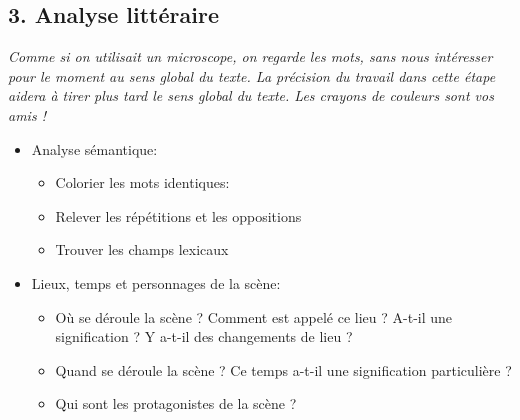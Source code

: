 \subsection*{3. Analyse littéraire}
\textit{Comme si on utilisait un microscope, on regarde les mots, sans nous intéresser pour le moment au sens global du texte. La précision du travail dans cette étape aidera à tirer plus tard le sens global du texte. Les crayons de couleurs sont vos amis !}
\begin{itemize}[label=]
\item Analyse sémantique:
\begin{itemize}[label=]
\item Colorier les mots identiques:
\item Relever les répétitions et les oppositions
\item Trouver les champs lexicaux
\end{itemize}
\item Lieux, temps et personnages de la scène:
\begin{itemize}[label=]
\item Où se déroule la scène ? Comment est appelé ce lieu ? A-t-il une signification ? Y a-t-il des changements de lieu ?
\item Quand se déroule la scène ? Ce temps a-t-il une signification particulière ?
\item Qui sont les protagonistes de la scène ? 
\end{itemize}
\end{itemize}
